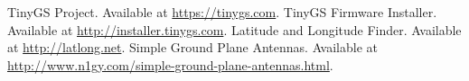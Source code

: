 \documentclass[12pt,a4paper]{article}
\begin{document}

\begin{thebibliography}{1}
     TinyGS Project. Available at \url{https://tinygs.com}.
     TinyGS Firmware Installer. Available at \url{http://installer.tinygs.com}.
     Latitude and Longitude Finder. Available at \url{http://latlong.net}.
     Simple Ground Plane Antennas. Available at \url{http://www.n1gy.com/simple-ground-plane-antennas.html}.
\end{thebibliography}
\end{document}
